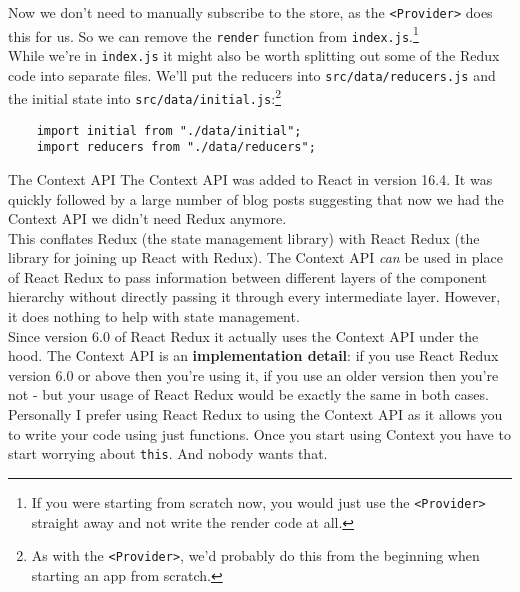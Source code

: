 Now we don't need to manually subscribe to the store, as the \texttt{<Provider>} does this for us. So we can remove the \texttt{render} function from \texttt{index.js}.\footnote{If you were starting from scratch now, you would just use the \texttt{<Provider>} straight away and not write the render code at all.}
\\

While we're in \texttt{index.js} it might also be worth splitting out some of the Redux code into separate files. We'll put the reducers into \texttt{src/data/reducers.js} and the initial state into \texttt{src/data/initial.js}:\footnote{As with the \texttt{<Provider>}, we'd probably do this from the beginning when starting an app from scratch.}

\begin{verbatim}
    import initial from "./data/initial";
    import reducers from "./data/reducers";
\end{verbatim}


\pagebreak


\begin{infobox}{The Context API}
    The Context API was added to React in version 16.4. It was quickly followed by a large number of blog posts suggesting that now we had the Context API we didn't need Redux anymore.
    \\

    This conflates Redux (the state management library) with React Redux (the library for joining up React with Redux). The Context API \textit{can} be used in place of React Redux to pass information between different layers of the component hierarchy without directly passing it through every intermediate layer. However, it does nothing to help with state management.
    \\

    Since version 6.0 of React Redux it actually uses the Context API under the hood. The Context API is an \textbf{implementation detail}: if you use React Redux version 6.0 or above then you're using it, if you use an older version then you're not - but your usage of React Redux would be exactly the same in both cases.
    \\

    Personally I prefer using React Redux to using the Context API as it allows you to write your code using just functions. Once you start using Context you have to start worrying about \texttt{this}. And nobody wants that.

\end{infobox}



